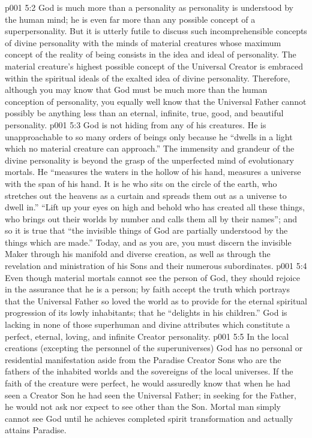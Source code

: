 \vs p001 5:2 God is much more than a personality as personality is understood by the human mind; he is even far more than any possible concept of a superpersonality. But it is utterly futile to discuss such incomprehensible concepts of divine personality with the minds of material creatures whose maximum concept of the reality of being consists in the idea and ideal of personality. The material creature’s highest possible concept of the Universal Creator is embraced within the spiritual ideals of the exalted idea of divine personality. Therefore, although you may know that God must be much more than the human conception of personality, you equally well know that the Universal Father cannot possibly be anything less than an eternal, infinite, true, good, and beautiful personality.
\vs p001 5:3 God is not hiding from any of his creatures. He is unapproachable to so many orders of beings only because he “dwells in a light which no material creature can approach.” The immensity and grandeur of the divine personality is beyond the grasp of the unperfected mind of evolutionary mortals. He “measures the waters in the hollow of his hand, measures a universe with the span of his hand. It is he who sits on the circle of the earth, who stretches out the heavens as a curtain and spreads them out as a universe to dwell in.” “Lift up your eyes on high and behold who has created all these things, who brings out their worlds by number and calls them all by their names”; and so it is true that “the invisible things of God are partially understood by the things which are made.” Today, and as you are, you must discern the invisible Maker through his manifold and diverse creation, as well as through the revelation and ministration of his Sons and their numerous subordinates.
\vs p001 5:4 Even though material mortals cannot see the person of God, they should rejoice in the assurance that he is a person; by faith accept the truth which portrays that the Universal Father so loved the world as to provide for the eternal spiritual progression of its lowly inhabitants; that he “delights in his children.” God is lacking in none of those superhuman and divine attributes which constitute a perfect, eternal, loving, and infinite Creator personality.
\vs p001 5:5 \pc In the local creations (excepting the personnel of the superuniverses) God has no personal or residential manifestation aside from the Paradise Creator Sons who are the fathers of the inhabited worlds and the sovereigns of the local universes. If the faith of the creature were perfect, he would assuredly know that when he had seen a Creator Son he had seen the Universal Father; in seeking for the Father, he would not ask nor expect to see other than the Son. Mortal man simply cannot see God until he achieves completed spirit transformation and actually attains Paradise.
